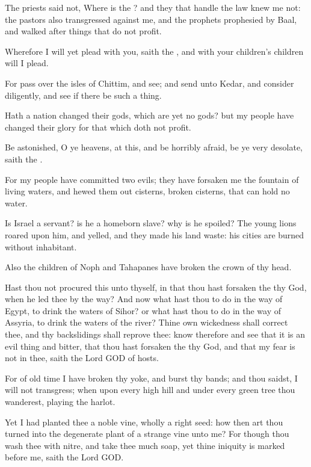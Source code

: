 \verse The priests said not, Where is the \LORD? and they that handle the law knew me not: the pastors also transgressed against me, and the prophets prophesied by Baal, and walked after things that do not profit.

\verse Wherefore I will yet plead with you, saith the \LORD, and with your children's children will I plead.

\verse For pass over the isles of Chittim, and see; and send unto Kedar, and consider diligently, and see if there be such a thing.

\verse Hath a nation changed their gods, which are yet no gods? but my people have changed their glory for that which doth not profit.

\verse Be astonished, O ye heavens, at this, and be horribly afraid, be ye very desolate, saith the \LORD.

\verse For my people have committed two evils; they have forsaken me the fountain of living waters, and hewed them out cisterns, broken cisterns, that can hold no water.

\verse Is Israel a servant? is he a homeborn slave? why is he spoiled?  \verse The young lions roared upon him, and yelled, and they made his land waste: his cities are burned without inhabitant.

\verse Also the children of Noph and Tahapanes have broken the crown of thy head.

\verse Hast thou not procured this unto thyself, in that thou hast forsaken the \LORD thy God, when he led thee by the way?  \verse And now what hast thou to do in the way of Egypt, to drink the waters of Sihor? or what hast thou to do in the way of Assyria, to drink the waters of the river?  \verse Thine own wickedness shall correct thee, and thy backslidings shall reprove thee: know therefore and see that it is an evil thing and bitter, that thou hast forsaken the \LORD thy God, and that my fear is not in thee, saith the Lord GOD of hosts.

\verse For of old time I have broken thy yoke, and burst thy bands; and thou saidst, I will not transgress; when upon every high hill and under every green tree thou wanderest, playing the harlot.

\verse Yet I had planted thee a noble vine, wholly a right seed: how then art thou turned into the degenerate plant of a strange vine unto me?  \verse For though thou wash thee with nitre, and take thee much soap, yet thine iniquity is marked before me, saith the Lord GOD.

